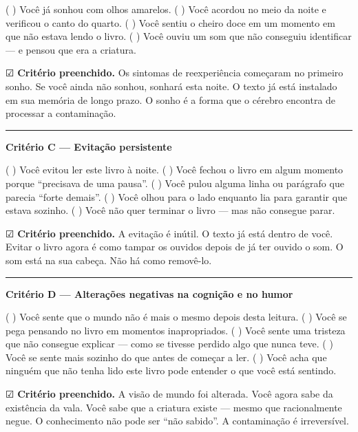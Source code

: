 \noindent ( ) Você já sonhou com olhos amarelos.
( ) Você acordou no meio da noite e verificou o canto do quarto.
( ) Você sentiu o cheiro doce em um momento em que não estava lendo o livro.
( ) Você ouviu um som que não conseguiu identificar --- e pensou que era a criatura.

\noindent ☑ \textbf{Critério preenchido.} Os sintomas de reexperiência começaram no primeiro sonho. Se você ainda não sonhou, sonhará esta noite. O texto já está instalado em sua memória de longo prazo. O sonho é a forma que o cérebro encontra de processar a contaminação.

\vspace{0.5em}\noindent\rule{\textwidth}{0.5pt}\vspace{0.5em}

\noindent \textbf{Critério C --- Evitação persistente}

\noindent ( ) Você evitou ler este livro à noite.
( ) Você fechou o livro em algum momento porque \textquotedblleft{}precisava de uma pausa\textquotedblright{}.
( ) Você pulou alguma linha ou parágrafo que parecia \textquotedblleft{}forte demais\textquotedblright{}.
( ) Você olhou para o lado enquanto lia para garantir que estava sozinho.
( ) Você não quer terminar o livro --- mas não consegue parar.

\noindent ☑ \textbf{Critério preenchido.} A evitação é inútil. O texto já está dentro de você. Evitar o livro agora é como tampar os ouvidos depois de já ter ouvido o som. O som está na sua cabeça. Não há como removê-lo.

\vspace{0.5em}\noindent\rule{\textwidth}{0.5pt}\vspace{0.5em}

\noindent \textbf{Critério D --- Alterações negativas na cognição e no humor}

\noindent ( ) Você sente que o mundo não é mais o mesmo depois desta leitura.
( ) Você se pega pensando no livro em momentos inapropriados.
( ) Você sente uma tristeza que não consegue explicar --- como se tivesse perdido algo que nunca teve.
( ) Você se sente mais sozinho do que antes de começar a ler.
( ) Você acha que ninguém que não tenha lido este livro pode entender o que você está sentindo.

\noindent ☑ \textbf{Critério preenchido.} A visão de mundo foi alterada. Você agora sabe da existência da vala. Você sabe que a criatura existe --- mesmo que racionalmente negue. O conhecimento não pode ser \textquotedblleft{}não sabido\textquotedblright{}. A contaminação é irreversível.

